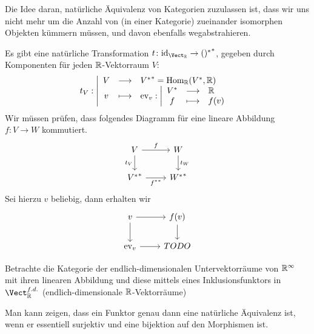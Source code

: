 \begin{oral}
    Die Idee daran, natürliche Äquivalenz von Kategorien zuzulassen ist, dass wir uns nicht mehr um die Anzahl von (in einer Kategorie) zueinander isomorphen Objekten kümmern müssen, und davon ebenfalls wegabstrahieren.
\end{oral}

\begin{example}
    Es gibt eine natürliche Transformation $t\colon  \id_{\Vect_{\R}} \to  {()^*}^*$, gegeben durch Komponenten für jeden $\mathbb{R}$-Vektorraum $V$:
        \begin{equation*}
        t_V: \left| \begin{array}{c c l} 
            V & \longrightarrow & {V^*}^* = \operatorname{Hom}_{\mathbb{R}}(V^*,\mathbb{R}) \\
        v & \longmapsto &
            \operatorname{ev}_v: \left| \begin{array}{c c l} 
            V^* & \longrightarrow & \mathbb{R} \\
            f & \longmapsto	 &f(v)
        \end{array} \right.
        \end{array} \right.
    \end{equation*}
    Wir müssen prüfen, dass folgendes Diagramm für eine lineare Abbildung $f\colon  V \to  W$ kommutiert.
    \[
    \begin{tikzcd}
        V \ar[swap]{d}{t_V} \ar{r}{f} & W \ar{d}{t_W}\\
        {V^*}^* \ar[swap]{r}{{f^*}^*} & {W^*}^*
    \end{tikzcd}
    \]
    Sei hierzu $v$ beliebig, dann erhalten wir
     \[
    \begin{tikzcd}
        v \ar[swap]{d}{} \ar{r}{} & f(v) \ar{d}{}\\
        \ev_v \ar[swap]{r}{} & TODO
    \end{tikzcd}
    \]
    
\end{example}

    \begin{example}
        Betrachte die Kategorie der endlich-dimensionalen Untervektorräume von $\mathbb{R}^{\infty}$ mit ihren linearen Abbildung und diese mittels eines Inklusionsfunktors in $\Vect_{\R}^{f.d.}$ (endlich-dimensionale $\mathbb{R}$-Vektorräume)
    \end{example}

    \begin{oral}
        Man kann zeigen, dass ein Funktor genau dann eine natürliche Äquivalenz ist, wenn er essentiell surjektiv  und eine bijektion auf den Morphismen ist.
    \end{oral}

